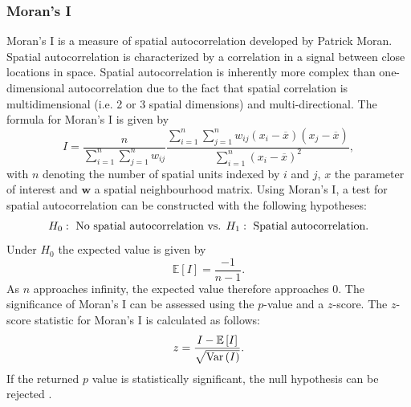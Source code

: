 \subsubsection{Moran's I}\label{sec:moran}
Moran's I is a measure of spatial autocorrelation developed by Patrick Moran. Spatial autocorrelation is characterized by a correlation in a signal between close locations in space. Spatial autocorrelation is inherently more complex than one-dimensional autocorrelation due to the fact that spatial correlation is multidimensional (i.e. 2 or 3 spatial dimensions) and multi-directional. The formula for Moran's I is given by
\begin{equation}
    I = \frac{n}{\sum_{i=1}^n\sum_{j=1}^nw_{ij}}\frac{\sum_{i=1}^n\sum_{j=1}^nw_{ij}\left(x_i-\overline{x}\right)\left(x_j-\overline{x}\right)}{\sum_{i=1}^n\left(x_i-\overline{x}\right)^2},
\end{equation}
with $n$ denoting the number of spatial units indexed by $i$ and $j$, $x$ the parameter of interest and $\pmb{w}$ a spatial neighbourhood matrix. \clearpage
Using Moran's I, a test for spatial autocorrelation can be constructed with the following hypotheses:
\begin{align}
    H_0:\hbox{ No spatial autocorrelation} \hbox{ vs. }  H_1:\hbox{ Spatial autocorrelation}.
\end{align}
Under $H_0$ the expected value is given by
\begin{equation}
    \mathbb{E}\left[I\right]=\frac{-1}{n-1}.
\end{equation}
As $n$ approaches infinity, the expected value therefore approaches 0.
The significance of Moran's I can be assessed using the $p$-value and a $z$-score. The $z$-score statistic for Moran's I is calculated as follows:
\begin{equation}
    z=\frac{I-\mathbb{E}\left[I\right]}{\sqrt{\hbox{Var}\left(I\right)}}.
\end{equation}
If the returned $p$ value is statistically significant, the null hypothesis can be rejected \autocite[][]{moran1950notes}.
